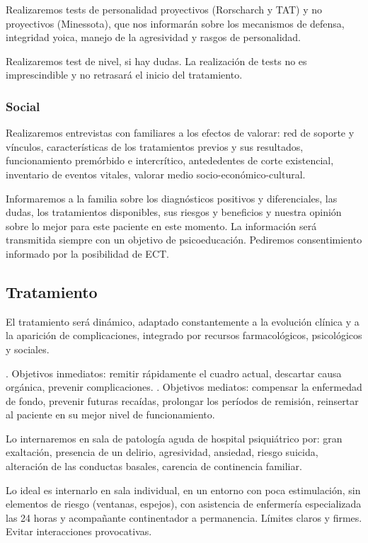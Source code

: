 Realizaremos tests de personalidad proyectivos (Rorscharch y TAT) y no proyectivos (Minessota), que nos informarán sobre los mecanismos de defensa, integridad yoica, manejo de la agresividad y rasgos de personalidad.

Realizaremos test de nivel, si hay dudas. La realización de tests no es imprescindible y no retrasará el inicio del tratamiento.
\subsubsection*{Social}
Realizaremos entrevistas con familiares a los efectos de valorar: red de soporte y vínculos, características de los tratamientos previos y sus resultados, funcionamiento premórbido e intercrítico, antededentes de corte existencial, inventario de eventos vitales, valorar medio socio-económico-cultural.

Informaremos a la familia sobre los diagnósticos positivos y diferenciales, las dudas, los tratamientos disponibles, sus riesgos y beneficios y nuestra opinión sobre lo mejor para este paciente en este momento. La información será transmitida siempre con un objetivo de psicoeducación. Pediremos consentimiento informado por la posibilidad de ECT.
\subsection*{Tratamiento}
El tratamiento será dinámico, adaptado constantemente a la evolución clínica y a la aparición de complicaciones, integrado por recursos farmacológicos, psicológicos y sociales\cite{yatham2018canadian}.

. Objetivos inmediatos: remitir rápidamente el cuadro actual, descartar causa orgánica, prevenir complicaciones.
. Objetivos mediatos: compensar la enfermedad de fondo, prevenir futuras recaídas, prolongar los períodos de remisión, reinsertar al paciente en su mejor nivel de funcionamiento.

Lo internaremos en sala de patología aguda de hospital psiquiátrico por: gran exaltación, presencia de un delirio, agresividad, ansiedad, riesgo suicida, alteración de las conductas basales, carencia de continencia familiar.

Lo ideal es internarlo en sala individual, en un entorno con poca estimulación, sin elementos de riesgo (ventanas, espejos), con asistencia de enfermería especializada las 24 horas y acompañante continentador a permanencia. Límites claros y firmes. Evitar interacciones provocativas.

